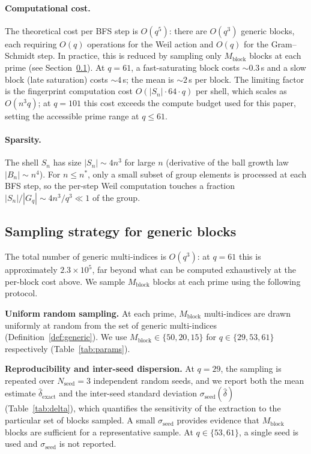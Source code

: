     \paragraph{Computational cost.}
      The theoretical cost per BFS step is $O(q^5)$: there are $O(q^3)$ generic blocks,
      each requiring $O(q)$ operations for the Weil action and $O(q)$ for the Gram--Schmidt
      step.
      In practice, this is reduced by sampling only $M_{\mathrm{block}}$ blocks at each prime
      (see Section~\ref{sec:sampling}).
      At $q=61$, a fast-saturating block costs $\sim 0.3$\,s and a slow block (late
      saturation) costs $\sim 4$\,s; the mean is $\sim 2$\,s per block.
      The limiting factor is the fingerprint computation cost $O(|S_n|\cdot 64\cdot q)$ per
      shell, which scales as $O(n^3 q)$; at $q=101$ this cost exceeds the compute budget used
      for this paper, setting the accessible prime range at $q\leq 61$.

    \paragraph{Sparsity.}
      The shell $S_n$ has size $|S_n|\sim 4n^3$ for large $n$ (derivative of the ball growth
      law $|B_n|\sim n^4$).
      For $n\leq n^*$, only a small subset of group elements is processed at each BFS step,
      so the per-step Weil computation touches a fraction $|S_n|/|G_q|\sim 4n^3/q^3\ll 1$
      of the group.

\subsection{Sampling strategy for generic blocks}
  \label{sec:sampling}

  The total number of generic multi-indices is $O(q^3)$: at $q=61$ this is approximately
  $2.3\times 10^5$, far beyond what can be computed exhaustively at the per-block cost above.
  We sample $M_{\mathrm{block}}$ blocks at each prime using the following protocol.

  \textbf{Uniform random sampling.}
  At each prime, $M_{\mathrm{block}}$ multi-indices are drawn uniformly at random from
  the set of generic multi-indices (Definition~\ref{def:generic}).
  We use $M_{\mathrm{block}}\in\{50,20,15\}$ for $q\in\{29,53,61\}$ respectively
  (Table~\ref{tab:params}).

  \textbf{Reproducibility and inter-seed dispersion.}
  At $q=29$, the sampling is repeated over $N_{\mathrm{seed}}=3$ independent random seeds,
  and we report both the mean estimate $\hat{\delta}_{\mathrm{exact}}$ and the inter-seed
  standard deviation $\sigma_{\mathrm{seed}}(\hat{\delta})$ (Table~\ref{tab:delta}), which
  quantifies the sensitivity of the extraction to the particular set of blocks sampled.
  A small $\sigma_{\mathrm{seed}}$ provides evidence that $M_{\mathrm{block}}$ blocks
  are sufficient for a representative sample.
  At $q\in\{53,61\}$, a single seed is used and $\sigma_{\mathrm{seed}}$ is not reported.


